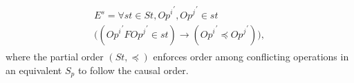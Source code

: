 \documentclass{sig-alternate-05-2015}
\begin{document}
\begin{align}\label{eqn:Causal}
\begin{split}
   E^{s} = \forall \mathit{st} \in \mathit{St}, {\mathit{Op}^i}^{'}, {\mathit{Op}^j}^{'} \in \mathit{st} \\ \big( \left( {\mathit{Op}^i}^{'} F {\mathit{Op}^j}^{'} \in \mathit{st} \right)
 \rightarrow \left( {\mathit{Op}^i}^{'} \preccurlyeq {\mathit{Op}^j}^{'} \right) \big), 
 \end{split}
  \end{align} where the partial order $\left( \mathit{St}, \preccurlyeq \right)$ enforces order among conflicting operations in an equivalent $S_p$ to follow the causal order.
\end{document}
